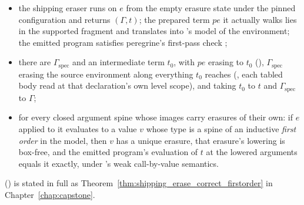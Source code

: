 \begin{itemize}
\item {} the shipping eraser runs on $e$ from the empty erasure state under the pinned
configuration and returns $(\Gamma, t)$; the prepared term $pe$ it actually walks lies in the
supported fragment and translates into 's model of the environment; the emitted
program satisfies peregrine's first-pass check ;
\item {} there are $\Gamma_{\mathrm{spec}}$ and an intermediate \lbox{} term $t_0$, with $pe$
erasing to $t_0$ (\Erases{}), $\Gamma_{\mathrm{spec}}$ erasing the source environment along everything
$t_0$ reaches (\ErasesEnv{}, each tabled body read at that declaration's own level scope), and
\Lower{} taking $t_0$ to $t$ and $\Gamma_{\mathrm{spec}}$ to $\Gamma$;
\item {} for every closed argument spine whose \lbox{} images carry erasures of
their own: if $e$ applied to it evaluates to a value $v$ whose type is a spine of an inductive
\emph{first order} in the model, then $v$ has a unique erasure, that erasure's lowering is box-free,
and the emitted program's evaluation of $t$ at the lowered arguments equals it exactly, under
\lbox{}'s weak call-by-value semantics.
\end{itemize}

 () is stated in full as
Theorem~\ref{thm:shipping_erase_correct_firstorder} in Chapter~\ref{chap:capstone}.


